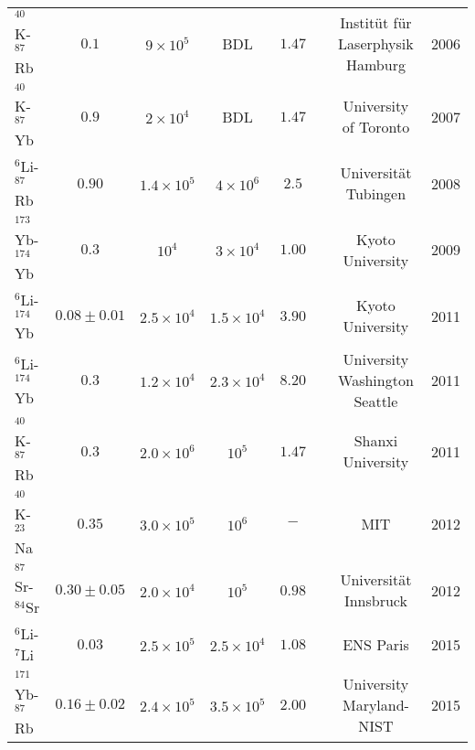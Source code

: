 \documentclass[pra,letterpaper,twocolumn,showpacs,superscriptaddress]{revtex4}
\begin{document}
\begin{table*}[t]
\begin{center}
\begin{tabular}{|l|c|c|c|c|c|c|c|}
 ${}^{40}$K-${}^{87}$Rb       &  $0.1$                               &   $9 \times 10^5$                       & BDL  &    $1.47$           &  \cite{Ospelkaus2006} & Instit\"ut f\"ur Laserphysik Hamburg & 2006  \\
 ${}^{40}$K-${}^{87}$Yb       &  $0.9$                                &  $2 \times 10^4$                        &  BDL &    $1.47$           &  \cite{Aubin2006}  & University of Toronto & 2007   \\
 ${}^6$Li-${}^{87}$Rb          &   $0.90$                             &  $1.4 \times 10^5$                     & $4 \times 10^6$     &     $2.5$          &  \cite{Deh2008}             & Universit\"at Tubingen & 2008 \\
 ${}^{173}$Yb-${}^{174}$Yb &  $0.3$                                &  $10^4$                                     &  $3 \times 10^4$     &     $1.00$            &   \cite{Fukuhara2009a}  & Kyoto University & 2009\\
 ${}^{6}$Li-${}^{174}$Yb      &  $0.08  \pm 0.01$             &  $2.5 \times 10^4$                     & $1.5 \times 10^4$   &     $3.90$            &   \cite{Hara2011}           &  Kyoto University & 2011  \\
 ${}^{6}$Li-${}^{174}$Yb       &  $0.3$                                &  $1.2 \times 10^4$  & $2.3 \times 10^4$   &     $8.20$            &   \cite{Hansen2011}      & University Washington Seattle & 2011 \\
 ${}^{40}$K-${}^{87}$Rb       &  $0.3$                                &  $2.0 \times 10^6$                     & $10^5$                  &    $1.47$            &   \cite{Wang2011}      & Shanxi University & 2011  \\
 ${}^{40}$K-${}^{23}$Na       &  $ 0.35$                            & $3.0 \times 10^5$                       & $10^6$                 &    $-$              & \cite{Park2012}  &    MIT & 2012 \\
${}^{87}$Sr-${}^{84}$Sr        &  $ 0.30 \pm 0.05$               & $2.0 \times 10^4$                       & $10^5$                 &    $0.98$              & \cite{Tey2010}  &  Universit\"at Innsbruck & 2012 \\
 ${}^6$Li-${}^7$Li                & $0.03$                              &  $2.5 \times 10^5$                      & $2.5 \times 10^4$  &      $1.08$          & \cite{Delehaye2015}     & ENS Paris & 2015  \\
 ${}^{171}$Yb-${}^{87}$Rb   &  $0.16 \pm 0.02$             &  $2.4 \times 10^5$                      & $3.5 \times 10^5$   &     $2.00$               &  \cite{Vaidya2015}       &  University Maryland-NIST & 2015  \\

\end{tabular}
\end{center}
\end{table*}
\end{document}
